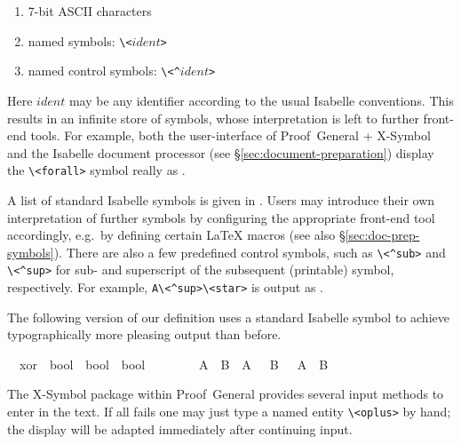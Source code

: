 \begin{isabellebody}
\begin{isamarkuptext}
\begin{enumerate}
  \item 7-bit ASCII characters

  \item named symbols: \verb,\,\verb,<,$ident$\verb,>,

  \item named control symbols: \verb,\,\verb,<^,$ident$\verb,>,

  \end{enumerate}

  Here $ident$ may be any identifier according to the usual Isabelle
  conventions.  This results in an infinite store of symbols, whose
  interpretation is left to further front-end tools.  For example,
  both the user-interface of Proof~General + X-Symbol and the Isabelle
  document processor (see \S\ref{sec:document-preparation}) display
  the \verb,\,\verb,<forall>, symbol really as \isa{{\isasymforall}}.

  A list of standard Isabelle symbols is given in
  \cite[appendix~A]{isabelle-sys}.  Users may introduce their own
  interpretation of further symbols by configuring the appropriate
  front-end tool accordingly, e.g.\ by defining certain {\LaTeX}
  macros (see also \S\ref{sec:doc-prep-symbols}).  There are also a
  few predefined control symbols, such as \verb,\,\verb,<^sub>, and
  \verb,\,\verb,<^sup>, for sub- and superscript of the subsequent
  (printable) symbol, respectively.  For example, \verb,A\<^sup>\<star>, is
  output as .

  \medskip The following version of our  definition uses a
  standard Isabelle symbol to achieve typographically more pleasing
  output than before.%
\end{isamarkuptext}%
\isamarkuptrue%
\isamarkupfalse%
\isamarkupfalse%
\isanewline
\ \ xor\ {\isacharcolon}{\isacharcolon}\ {\isachardoublequote}bool\ {\isasymRightarrow}\ bool\ {\isasymRightarrow}\ bool{\isachardoublequote}\ \ \ \ {\isacharparenleft}\ {\isachardoublequote}{\isasymoplus}{\isachardoublequote}\ {}{}{\isacharparenright}\isanewline
\ \ {\isachardoublequote}A\ {\isasymoplus}\ B\ {\isasymequiv}\ {\isacharparenleft}A\ {\isasymand}\ {\isasymnot}\ B{\isacharparenright}\ {\isasymor}\ {\isacharparenleft}{\isasymnot}\ A\ {\isasymand}\ B{\isacharparenright}{\isachardoublequote}\isamarkupfalse%
\isamarkupfalse%
%
\begin{isamarkuptext}%
\noindent The X-Symbol package within Proof~General provides several
  input methods to enter \isa{{\isasymoplus}} in the text.  If all fails one may
  just type a named entity \verb,\,\verb,<oplus>, by hand; the display
  will be adapted immediately after continuing input.


\end{isamarkuptext}
\end{isabellebody}
